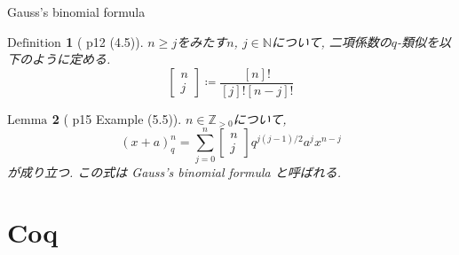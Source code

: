 \documentclass[dvipdfmx,cjk]{beamer}
\theoremstyle{mystyle}
\newtheorem{df}{$\textrm{Definition}$}[section]
\newtheorem{lem}[df]{$\textrm{Lemma}$}
\newcommand{\bpf}{\begin{proof}}
\newcommand{\epf}{\end{proof}}
\newcommand{\N}{\mathbb{N}}
\newcommand{\Z}{\mathbb{Z}}
\newcommand{\qcoe}[2]{\left[\begin{array}{ccc}#1\\#2\end{array}\right]}
\newcommand{\0}{\textbf{0}}
\begin{document}
\begin{frame}{Gauss's binomial formula}
	\begin{df}[\cite{Kac} p12 (4.5)]
		$n \ge j$をみたす$n$, $j \in \N$について, 二項係数の$q$-類似を以下のように定める. 
		\[
			\qcoe{n}{j} \coloneqq \frac{[n]!}{[j]![n - j]!}
		\]
	\end{df}
   \begin{lem}[\cite{Kac} p15 Example (5.5)]
	  $n \in \Z_{>0}$について, 
	  \[
	    (x + a)^n_q = \sum_{j = 0}^n \qcoe{n}{j} q^{j (j - 1)/2} a^j x^{n - j}
	  \]
	  が成り立つ. この式は Gauss's binomial formula と呼ばれる. 
	\end{lem}
\end{frame}
\section{Coq}

\begin{frame}
  \tableofcontents[currentsection] 
\end{frame}

\end{document}
